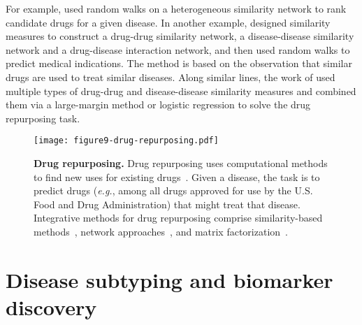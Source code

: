 \documentclass[5p]{elsarticle}
\newcommand{\eg}{\emph{e.g.}\xspace}
\newcommand{\rev}[1]{{\color{black}#1}}
\begin{document}
For example, \cite{Wang2013drug,Wang2014drug,Luo2016drug,Luo2017network} used random walks on a heterogeneous similarity network to rank candidate drugs for a given disease.
In another example, \cite{Luo2016drug} designed similarity measures to construct a drug-drug similarity network, a disease-disease similarity network and a drug-disease interaction network, and then used random walks to predict medical indications.
The method is based on the observation that similar drugs are used to treat similar diseases.
Along similar lines, the work of \cite{Gottlieb2011predict,Zhang2013computational} used multiple types of drug-drug and disease-disease similarity measures and combined them via a large-margin method or logistic regression to solve the drug repurposing task.

\begin{figure}[t]
\centering
\texttt{[image: figure9-drug-repurposing.pdf]}
\caption{\textbf{Drug repurposing.} \rev{Drug} repurposing uses computational methods to find new uses for existing \rev{drugs~\cite{Li2015,Hodos2016}.} Given a disease, the task is to predict drugs (\eg, among all drugs approved for use by the U.S. Food and Drug Administration) that might \rev{treat} that disease. Integrative methods for drug repurposing comprise similarity-based methods~\cite{Gottlieb2011predict}, network \rev{approaches}~\cite{Wang2014drug,Himmelstein2017systematic,Luo2017network}, and matrix factorization~\cite{Zhang2014towards}.}
\label{fig:drug-repurposing}
\end{figure}

\section{Disease subtyping and biomarker discovery}\label{sec:patient}
\end{document}
